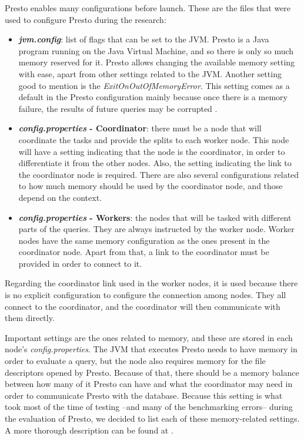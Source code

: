 \documentclass[conference]{IEEEtran}
\begin{document}
Presto enables many configurations before launch. These are the files that were used to configure Presto during the research:

\begin{itemize}
    \item \textbf{\textit{jvm.config}}: list of flags that can be set to the JVM. Presto is a Java program running on the Java Virtual Machine, and so there is only so much memory reserved for it. Presto allows changing the available memory setting with ease, apart from other settings related to the JVM. Another setting good to mention is the \textit{ExitOnOutOfMemoryError}. This setting comes as a default in the Presto configuration mainly because once there is a memory failure, the results of future queries may be corrupted \cite{the-presto-foundation-no-date}.
    \item \textbf{\textit{config.properties} - Coordinator}: there must be a node that will coordinate the tasks and provide the splits to each worker node. This node will have a setting indicating that the node is the coordinator, in order to differentiate it from the other nodes. Also, the setting indicating the link to the coordinator node is required. There are also several configurations related to how much memory should be used by the coordinator node, and those depend on the context.
    \item \textbf{\textit{config.properties} - Workers}: the nodes that will be tasked with different parts of the queries. They are always instructed by the worker node. Worker nodes have the same memory configuration as the ones present in the coordinator node. Apart from that, a link to the coordinator must be provided in order to connect to it.
\end{itemize}

Regarding the coordinator link used in the worker nodes, it is used because there is no explicit configuration to configure the connection among nodes. They all connect to the coordinator, and the coordinator will then communicate with them directly.

Important settings are the ones related to memory, and these are stored in each node's \textit{config.properties}. The JVM that executes Presto needs to have memory in order to evaluate a query, but the node also requires memory for the file descriptors opened by Presto. Because of that, there should be a memory balance between how many of it Presto can have and what the coordinator may need in order to communicate Presto with the database. Because this setting is what took most of the time of testing –and many of the benchmarking errors– during the evaluation of Presto, we decided to list each of these memory-related settings. A more thorough description can be found at \cite{saversky-2020}.
\end{document}
